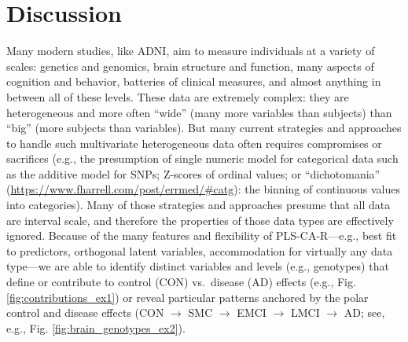 \documentclass[12pt]{article}
\begin{document}
\hypertarget{discussion}{%
\section{Discussion}\label{discussion}}

\label{section:Disc}

Many modern studies, like ADNI, aim to measure individuals at a variety
of scales: genetics and genomics, brain structure and function, many
aspects of cognition and behavior, batteries of clinical measures, and
almost anything in between all of these levels. These data are extremely
complex: they are heterogeneous and more often ``wide'' (many more
variables than subjects) than ``big'' (more subjects than variables).
But many current strategies and approaches to handle such multivariate
heterogeneous data often requires compromises or sacrifices (e.g., the
presumption of single numeric model for categorical data such as the
additive model for SNPs; Z-scores of ordinal values; or ``dichotomania''
(\url{https://www.fharrell.com/post/errmed/\#catg}): the binning of
continuous values into categories). Many of those strategies and
approaches presume that all data are interval scale, and therefore the
properties of those data types are effectively ignored. Because of the
many features and flexibility of PLS-CA-R---e.g., best fit to
predictors, orthogonal latent variables, accommodation for virtually any
data type---we are able to identify distinct variables and levels (e.g.,
genotypes) that define or contribute to control (CON) vs.~disease (AD)
effects (e.g., Fig. \ref{fig:contributions_ex1}) or reveal particular
patterns anchored by the polar control and disease effects (CON
\(\rightarrow\) SMC \(\rightarrow\) EMCI \(\rightarrow\) LMCI
\(\rightarrow\) AD; see, e.g., Fig. \ref{fig:brain_genotypes_ex2}).
\end{document}
